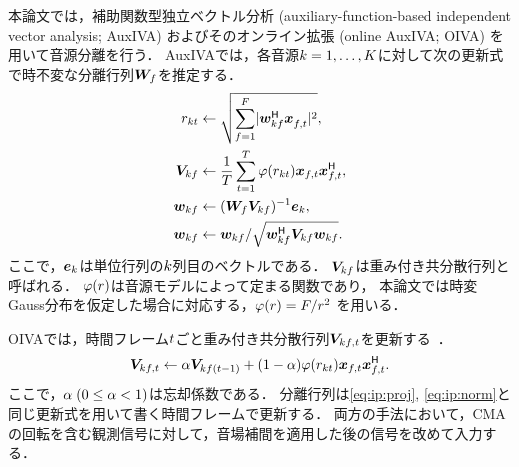 \documentclass[sip,biber]{now-journal}
\begin{document}
本論文では，補助関数型独立ベクトル分析 (auxiliary-function-based independent vector analysis; AuxIVA) \cite{Ono:2011:WASPAA}
およびそのオンライン拡張 (online AuxIVA; OIVA) \cite{Taniguchi:2014:HSCMA} を用いて音源分離を行う．
AuxIVAでは，各音源$k = 1, \dots, K$に対して次の更新式で時不変な分離行列$\bm{W} _{f}$を推定する．
\begin{align}
  \var _{\src\tframe} &\gets \sqrt{\sum _{\freq=1} ^{\Freq} \lvert \demix ^{\hermite} _{\src\freq} \Obs ^{\nohermite}_{\ft} \rvert ^2}, \\
  \cov _{\src\freq} &\gets \frac{1}{\Tframe} \sum _{\tframe=1} ^{\Tframe} \weight (\var_{\src\tframe}) \Obs _{\ft} \Obs _{\ft}^{\hermite}, \\
  \demix _{\src\freq} &\gets (\Demix _{\freq} \cov _{\src\freq}) ^{-1} \bm{e} _{\src} \label{eq:ip:proj}, \\
  \demix _{\src\freq} &\gets {\demix _{\src\freq}} / {\sqrt{\demix _{\src\freq} ^{\hermite} \cov _{\src\freq} \demix _{\src\freq}}} \label{eq:ip:norm}.
\end{align}
ここで，$\bm{e}_{k}$は単位行列の$k$列目のベクトルである．
$\bm{V} _{kf}$は{重み付き共分散行列}と呼ばれる．
$\varphi(r)$は音源モデルによって定まる関数であり，
本論文では時変Gauss分布を仮定した場合に対応する，$\varphi (r) = F/{r ^2}$ \cite{Ono:2012:APSIPA}を用いる．

OIVAでは，時間フレーム$t$ごと重み付き共分散行列$\cov _{\src\ft}$を更新する~\cite{Taniguchi:2014:HSCMA}．
\begin{equation}
  \cov _{\src\ft} \gets \forget \cov _{\src\freq(\tframe-1)} + (1 - \forget) \weight ({\var _{\src\tframe}}) \Obs _{\ft} \Obs _{\ft}^{\hermite}.
\end{equation}
ここで，$\alpha\; (0 \leq \alpha < 1)$は忘却係数である．
分離行列は\cref{eq:ip:proj}, \cref{eq:ip:norm}と同じ更新式を用いて書く時間フレームで更新する．
両方の手法において，CMAの回転を含む観測信号に対して，音場補間を適用した後の信号を改めて入力する．

\end{document}

